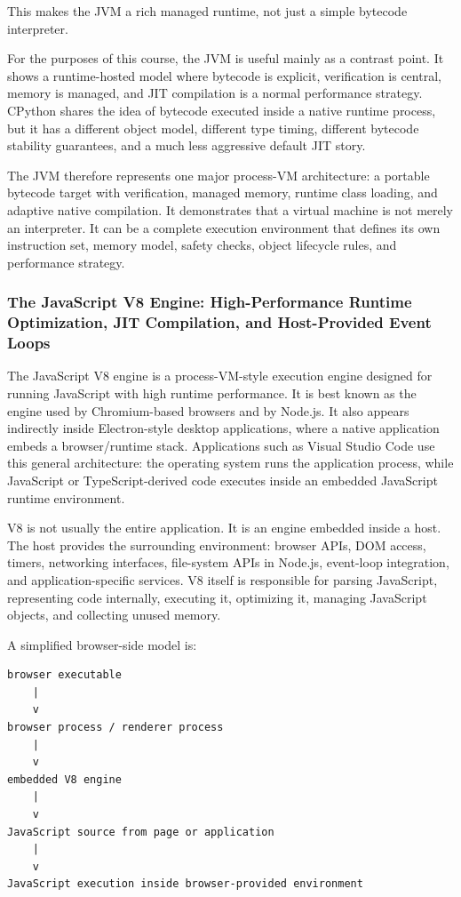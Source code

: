 This makes the JVM a rich managed runtime, not just a simple bytecode interpreter.

For the purposes of this course, the JVM is useful mainly as a contrast point. It shows a runtime-hosted model where bytecode is explicit, verification is central, memory is managed, and JIT compilation is a normal performance strategy. CPython shares the idea of bytecode executed inside a native runtime process, but it has a different object model, different type timing, different bytecode stability guarantees, and a much less aggressive default JIT story.

The JVM therefore represents one major process-VM architecture: a portable bytecode target with verification, managed memory, runtime class loading, and adaptive native compilation. It demonstrates that a virtual machine is not merely an interpreter. It can be a complete execution environment that defines its own instruction set, memory model, safety checks, object lifecycle rules, and performance strategy.


\subsubsection{The JavaScript V8 Engine: High-Performance Runtime Optimization, JIT Compilation, and Host-Provided Event Loops}

The JavaScript V8 engine is a process-VM-style execution engine designed for running JavaScript with high runtime performance. It is best known as the engine used by Chromium-based browsers and by Node.js. It also appears indirectly inside Electron-style desktop applications, where a native application embeds a browser/runtime stack. Applications such as Visual Studio Code use this general architecture: the operating system runs the application process, while JavaScript or TypeScript-derived code executes inside an embedded JavaScript runtime environment.

V8 is not usually the entire application. It is an engine embedded inside a host. The host provides the surrounding environment: browser APIs, DOM access, timers, networking interfaces, file-system APIs in Node.js, event-loop integration, and application-specific services. V8 itself is responsible for parsing JavaScript, representing code internally, executing it, optimizing it, managing JavaScript objects, and collecting unused memory.

A simplified browser-side model is:

\begin{verbatim}
browser executable
    |
    v
browser process / renderer process
    |
    v
embedded V8 engine
    |
    v
JavaScript source from page or application
    |
    v
JavaScript execution inside browser-provided environment
\end{verbatim}

